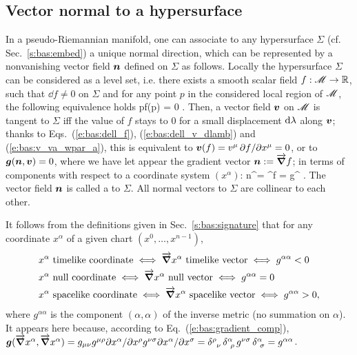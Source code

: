 \subsection{Vector normal to a hypersurface} \label{s:bas:hyp_normal}

In a pseudo-Riemannian manifold, one can associate to any hypersurface
$\Sigma$ (cf. Sec.~\ref{s:bas:embed}) a unique normal direction, which can
be represented by a nonvanishing vector field $\bm{n}$ defined on $\Sigma$ as follows.
Locally the hypersurface $\Sigma$ can be considered as a level set, i.e.
there exists a smooth scalar field $f:\mathscr{M} \rightarrow \mathbb{R}$, such that
$\dd f \neq 0$ on $\Sigma$ and
for any point $p$ in the considered local region of $\mathscr{M}$, the following equivalence
holds
\be
    p\in \Sigma \iff f(p) = 0 .
\ee
Then, a vector field $\bm{v}$ on $\mathscr{M}$ is tangent to $\Sigma$ iff
the value of $f$ stays to $0$ for a small displacement
$\mathrm{d}\lambda$ along $\bm{v}$; thanks to Eqs.~(\ref{e:bas:dell_f}),
(\ref{e:bas:dell_v_dlamb}) and (\ref{e:bas:v_va_wpar_a}), this is equivalent to
$\bm{v}(f) = v^\mu\,  {\partial f}/{\partial x^\mu} = 0$,
or to $\bm{g}(\bm{n},\bm{v}) = 0$,
where we have let appear the gradient vector $\bm{n} := \overrightarrow{\bm{\nabla}} f$; in
terms of components with respect to a coordinate system $(x^\alpha)$:
\be \label{e:bas:gradient_comp}
    n^\alpha = \nabla^\alpha f = g^{\alpha\mu}  .
\ee
The vector field $\bm{n}$ is called a 
to $\Sigma$. All normal vectors to $\Sigma$ are collinear to each other.

It follows from the definitions given in Sec.~\ref{s:bas:signature} that
for any coordinate $x^\alpha$ of a given chart $(x^0,\ldots,x^{n-1})$,
\begin{subequations}
\label{e:bas:char_causal_type_coord}
\begin{align}
& x^\alpha \ \mbox{timelike coordinate}  \iff \vw{\nabla} x^\alpha \ \mbox{timelike vector}
  \iff g^{\alpha\alpha} < 0  \\
& x^\alpha \ \mbox{null coordinate}  \iff \vw{\nabla} x^\alpha \ \mbox{null vector}
  \iff g^{\alpha\alpha} = 0  \label{e:bas:char_null_coord} \\
& x^\alpha \ \mbox{spacelike coordinate}  \iff \vw{\nabla} x^\alpha \ \mbox{spacelike vector}
  \iff g^{\alpha\alpha} > 0 ,
\end{align}
\end{subequations}
where $g^{\alpha\alpha}$ is the component $(\alpha,\alpha)$ of the inverse metric
(no summation on $\alpha$). It appears here because, according to Eq.~(\ref{e:bas:gradient_comp}),
$\bm{g}(\overrightarrow{\bm{\nabla}} x^\alpha , \overrightarrow{\bm{\nabla}} x^\alpha ) = g_{\mu\nu} g^{\mu\rho} {\partial x^\alpha}/{\partial x^\rho}
 g^{\nu\sigma} {\partial x^\alpha}/{\partial x^\sigma} = \delta^\rho_{\ \, \nu} \, \delta^\alpha_{\ \rho} \, g^{\nu\sigma}\,
 \delta^\alpha_{\ \sigma} = g^{\alpha\alpha}$.

